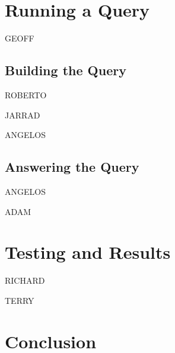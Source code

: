 \documentclass[runningheads]{llncs}
\begin{document}
\section{Running a Query}
\label{Running}

GEOFF

\subsection{Building the Query}
\label{BuildingQuery}

ROBERTO

JARRAD

ANGELOS

\subsection{Answering the Query}
\label{AnsweringQuery}

ANGELOS

ADAM

\section{Testing and Results}
\label{Testing}

RICHARD

TERRY 
\section{Conclusion}
\label{Conclusion}



\end{document}
